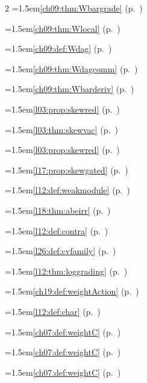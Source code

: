 \begin{multicols}{2}
\hangindent=1.5em\quad \ref{ch09:thm:Wbargrade} (p.~\pageref{ch09:thm:Wbargrade})\par
\hangindent=1.5em\quad \ref{ch09:thm:Wlocal} (p.~\pageref{ch09:thm:Wlocal})\par
\hangindent=1.5em\quad \ref{ch09:def:Wdag} (p.~\pageref{ch09:def:Wdag})\par
\hangindent=1.5em\quad \ref{ch09:thm:Wdagcomm} (p.~\pageref{ch09:thm:Wdagcomm})\par
\hangindent=1.5em\quad \ref{ch09:thm:Wbarderiv} (p.~\pageref{ch09:thm:Wbarderiv})\par
\hangindent=1.5em\quad \ref{l03:prop:skewred} (p.~\pageref{l03:prop:skewred})\par
\hangindent=1.5em\quad \ref{l03:thm:skewvac} (p.~\pageref{l03:thm:skewvac})\par
\hangindent=1.5em\quad \ref{l03:prop:skewred} (p.~\pageref{l03:prop:skewred})\par
\hangindent=1.5em\quad \ref{l17:prop:skewgated} (p.~\pageref{l17:prop:skewgated})\par
\hangindent=1.5em\quad \ref{l12:def:weakmodule} (p.~\pageref{l12:def:weakmodule})\par
\hangindent=1.5em\quad \ref{l18:thm:abeirr} (p.~\pageref{l18:thm:abeirr})\par
\hangindent=1.5em\quad \ref{l12:def:contra} (p.~\pageref{l12:def:contra})\par
\hangindent=1.5em\quad \ref{l26:def:cvfamily} (p.~\pageref{l26:def:cvfamily})\par
\hangindent=1.5em\quad \ref{l12:thm:loggrading} (p.~\pageref{l12:thm:loggrading})\par
\hangindent=1.5em\quad \ref{ch19:def:weightAction} (p.~\pageref{ch19:def:weightAction})\par
\hangindent=1.5em\quad \ref{l12:def:char} (p.~\pageref{l12:def:char})\par
\hangindent=1.5em\quad \ref{ch07:def:weightC} (p.~\pageref{ch07:def:weightC})\par
\hangindent=1.5em\quad \ref{ch07:def:weightC} (p.~\pageref{ch07:def:weightC})\par
\hangindent=1.5em\quad \ref{ch07:def:weightC} (p.~\pageref{ch07:def:weightC})\par

\end{multicols}

